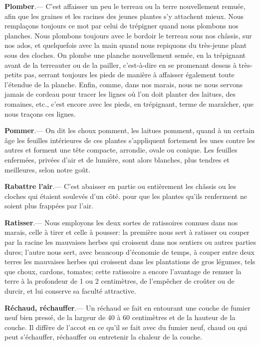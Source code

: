 \documentclass[10pt,a4paper]{book}
\begin{document}
\textbf{Plomber}.--- C'est affaisser un peu le terreau ou la terre nouvellement remuée, afin que les graines et les racines des jeunes plantes s'y attachent mieux. Nous remplaçons toujours ce mot par celui de trépigner quand nous plombons nos planches. Nous plombons toujours avec le bordoir le terreau sous nos châssis, sur nos ados, et quelquefois avec la main quand nous repiquons du très-jeune plant sous des cloches. On plombe une planche nouvellement semée, en la trépignant avant de la terreauter ou de la pailler, c'est-à-dire en se promenant dessus à très-petits pas, serrant toujours les pieds de manière à affaisser également toute l'étendue de la planche. Enfin, comme, dans nos marais, nous ne nous servons jamais de cordeau pour tracer les lignes où l'on doit planter des laitues, des romaines, etc., c'est encore avec les pieds, en trépignant, terme de maraîcher, que nous traçons ces lignes.

\textbf{Pommer}.--- On dit les choux pomment, les laitues pomment, quand à un certain âge les feuilles intérieures de ces plantes s'appliquent fortement les unes contre les autres et forment une tête compacte, arrondie, ovale ou conique. Les feuilles enfermées, privées d'air et de lumière, sont alors blanches, plus tendres et meilleures, selon notre goût.

\textbf{Rabattre l'air}.--- C'est abaisser en partie ou entièrement les châssis ou les cloches qui étaient soulevés d'un côté. pour que les plantes qu'ils renferment ne soient plus frappées par l'air.

\textbf{Ratisser}.--- Nous employons les deux sortes de ratissoires connues dans nos marais, celle à tirer et celle à pousser: la première nous sert à ratisser ou couper par la racine les mauvaises herbes qui croissent dans nos sentiers ou autres parties dures; l'autre nous sert, avec beaucoup d'économie de temps, à couper entre deux terres les mauvaises herbes qui croissent dans les plantations de gros légumes, tels que choux, cardons, tomates; cette ratissoire a encore l'avantage de remuer la terre à la profondeur de 1 ou 2 centimètres, de l'empêcher de croûter ou de durcir, et lui conserve sa faculté attractive.

\textbf{Réchaud, réchauffer}.--- Un réchaud se fait en entourant une couche de fumier neuf bien pressé, de la largeur de 40 à 60 centimètres et de la hauteur de la couche. Il diffère de l'accot en ce qu'il se fait avec du fumier neuf, chaud ou qui peut s'échauffer, réchauffer ou entretenir la chaleur de la couche.
\end{document}
